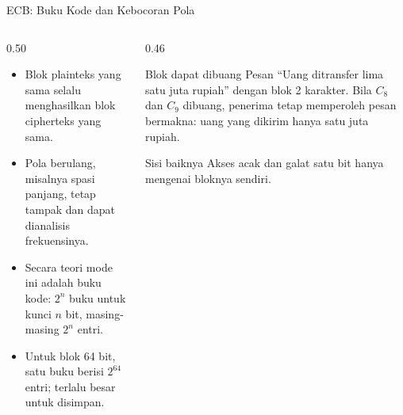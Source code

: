 \documentclass[aspectratio=169,11pt]{beamer}
\begin{document}
\begin{frame}{ECB: Buku Kode dan Kebocoran Pola}
    \begin{columns}[T,onlytextwidth]
        \begin{column}{0.50\textwidth}
            \footnotesize
            \begin{itemize}
                \item Blok plainteks yang sama selalu menghasilkan blok
                      cipherteks yang sama.
                \item Pola berulang, misalnya spasi panjang, tetap tampak
                      dan dapat dianalisis frekuensinya.
                \item Secara teori mode ini adalah buku kode: $2^n$ buku
                      untuk kunci $n$ bit, masing-masing $2^n$ entri.
                \item Untuk blok 64 bit, satu buku berisi $2^{64}$ entri;
                      terlalu besar untuk disimpan.
            \end{itemize}
        \end{column}
        \begin{column}{0.46\textwidth}
            \begin{alertblock}{Blok dapat dibuang}
                \footnotesize
                Pesan ``Uang ditransfer lima satu juta rupiah'' dengan
                blok 2 karakter. Bila $C_8$ dan $C_9$ dibuang, penerima
                tetap memperoleh pesan bermakna: uang yang dikirim hanya
                satu juta rupiah.
            \end{alertblock}
            \begin{exampleblock}{Sisi baiknya}
                \footnotesize
                Akses acak dan galat satu bit hanya mengenai bloknya
                sendiri.
            \end{exampleblock}
        \end{column}
    \end{columns}
\end{frame}
\end{document}
